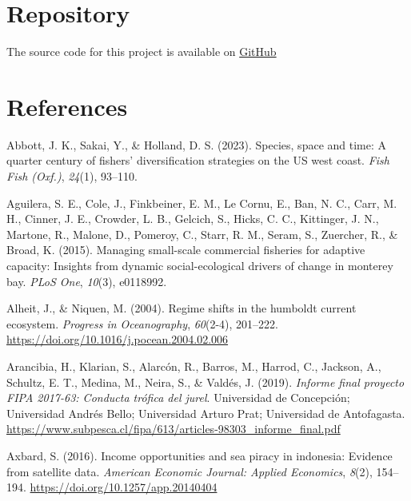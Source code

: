 \documentclass[
  11pt,
]{article}
\newlength{\cslhangindent}
\newenvironment{CSLReferences}[2] %
 {\begin{list}{}{%
  \setlength{\itemindent}{0pt}
  \setlength{\leftmargin}{0pt}
  \setlength{\parsep}{0pt}
  \ifodd #1
   \setlength{\leftmargin}{\cslhangindent}
   \setlength{\itemindent}{-1\cslhangindent}
  \fi
  \setlength{\itemsep}{#2\baselineskip}}}
 {\end{list}}
\begin{document}
\section{Repository}\label{repository}

The source code for this project is available on
\href{https://github.com/fquezadae/Impact-of-Environmental-Variability-on-Harvest}{GitHub}

\section{References}\label{references}

\label{refs}
\begin{CSLReferences}{1}{0}
Abbott, J. K., Sakai, Y., \& Holland, D. S. (2023). Species, space and time: A quarter century of fishers' diversification strategies on the {US} west coast. \emph{Fish Fish (Oxf.)}, \emph{24}(1), 93--110.

Aguilera, S. E., Cole, J., Finkbeiner, E. M., Le Cornu, E., Ban, N. C., Carr, M. H., Cinner, J. E., Crowder, L. B., Gelcich, S., Hicks, C. C., Kittinger, J. N., Martone, R., Malone, D., Pomeroy, C., Starr, R. M., Seram, S., Zuercher, R., \& Broad, K. (2015). Managing small-scale commercial fisheries for adaptive capacity: Insights from dynamic social-ecological drivers of change in monterey bay. \emph{PLoS One}, \emph{10}(3), e0118992.

Alheit, J., \& Niquen, M. (2004). Regime shifts in the humboldt current ecosystem. \emph{Progress in Oceanography}, \emph{60}(2-4), 201--222. \url{https://doi.org/10.1016/j.pocean.2004.02.006}

Arancibia, H., Klarian, S., Alarcón, R., Barros, M., Harrod, C., Jackson, A., Schultz, E. T., Medina, M., Neira, S., \& Valdés, J. (2019). \emph{Informe final proyecto FIPA 2017-63: Conducta trófica del jurel}. Universidad de Concepción; Universidad Andrés Bello; Universidad Arturo Prat; Universidad de Antofagasta. \url{https://www.subpesca.cl/fipa/613/articles-98303_informe_final.pdf}

Axbard, S. (2016). Income opportunities and sea piracy in indonesia: Evidence from satellite data. \emph{American Economic Journal: Applied Economics}, \emph{8}(2), 154--194. \url{https://doi.org/10.1257/app.20140404}


\end{CSLReferences}
\end{document}
